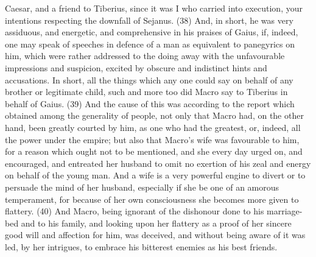 Caesar, and a friend to Tiberius, since it was I who carried into execution, your intentions
respecting the downfall of Sejanus. (38) And, in short, he was very assiduous, and energetic, and
comprehensive in his praises of Gaius, if, indeed, one may speak of speeches in defence of a
man as equivalent to panegyrics on him, which were rather addressed to the doing away with the
unfavourable impressions and suspicion, excited by obscure and indistinct hints and accusations.
In short, all the things which any one could say on behalf of any brother or legitimate child, such
and more too did Macro say to Tiberius in behalf of Gaius. (39) And the cause of this was
according to the report which obtained among the generality of people, not only that Macro had, on
the other hand, been greatly courted by him, as one who had the greatest, or, indeed, all the power
under the empire; but also that Macro's wife was favourable to him, for a reason which ought not to
be mentioned, and she every day urged on, and encouraged, and entreated her husband to omit
no exertion of his zeal and energy on behalf of the young man. And a wife is a very powerful engine
to divert or to persuade the mind of her husband, especially if she be one of an amorous
temperament, for because of her own consciousness she becomes more given to flattery. (40)
And Macro, being ignorant of the dishonour done to his marriage-bed and to his family, and looking
upon her flattery as a proof of her sincere good will and affection for him, was deceived, and
without being aware of it was led, by her intrigues, to embrace his bitterest enemies as his best
friends.


